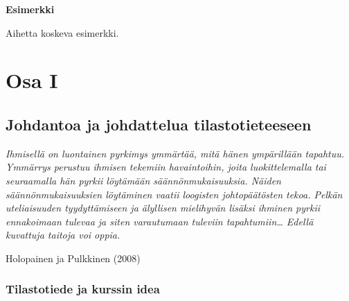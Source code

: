 \documentclass[
]{book}
\begin{document}
\begin{eblock}{}
\textbf{Esimerkki}

Aihetta koskeva esimerkki.

\end{eblock}


\hypertarget{part-osa-i}{%
\part{Osa I}\label{part-osa-i}}

\hypertarget{johdantoa-ja-johdattelua-tilastotieteeseen}{%
\chapter{Johdantoa ja johdattelua tilastotieteeseen}\label{johdantoa-ja-johdattelua-tilastotieteeseen}}

\emph{Ihmisellä on luontainen pyrkimys ymmärtää, mitä hänen ympärillään tapahtuu. Ymmärrys perustuu ihmisen tekemiin havaintoihin, joita luokittelemalla tai seuraamalla hän pyrkii löytämään säännönmukaisuuksia. Näiden säännönmukaisuuksien löytäminen vaatii loogisten johtopäätösten tekoa. Pelkän uteliaisuuden tyydyttämiseen ja älyllisen mielihyvän lisäksi ihminen pyrkii ennakoimaan tulevaa ja siten varautumaan tuleviin tapahtumiin\ldots{} Edellä kuvattuja taitoja voi oppia.}

Holopainen ja Pulkkinen (2008)

\hypertarget{tilastotiede-ja-kurssin-idea}{%
\section{Tilastotiede ja kurssin idea}\label{tilastotiede-ja-kurssin-idea}}
\end{document}

